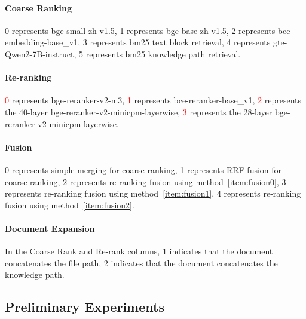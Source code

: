 \documentclass[11pt]{article}
\def\retrievaltextcircled#1{\large{\textcircled{\small{\color{blue}#1}}}\normalsize}
\def\reranktextcircled#1{\large{\textcircled{\small{\textcolor{red}{#1}}}}\normalsize}
\def\fusiontextcircled#1{\large{\textcircled{\small{\color{green}#1}}}\normalsize}
\def\doctextcircled#1{\large{\textcircled{\small{\color{purple}#1}}}\normalsize}
\begin{document}
\paragraph{Coarse Ranking} \retrievaltextcircled{0} represents bge-small-zh-v1.5, \retrievaltextcircled{1} represents bge-base-zh-v1.5, \retrievaltextcircled{2} represents bce-embedding-base\_v1, \retrievaltextcircled{3} represents bm25 text block retrieval, \retrievaltextcircled{4} represents gte-Qwen2-7B-instruct, \retrievaltextcircled{5} represents bm25 knowledge path retrieval.

\paragraph{Re-ranking} \reranktextcircled{0} represents bge-reranker-v2-m3, \reranktextcircled{1} represents bce-reranker-base\_v1, \reranktextcircled{2} represents the 40-layer bge-reranker-v2-minicpm-layerwise, \reranktextcircled{3} represents the 28-layer bge-reranker-v2-minicpm-layerwise.

\paragraph{Fusion} \fusiontextcircled{0} represents simple merging for coarse ranking, \fusiontextcircled{1} represents RRF fusion for coarse ranking, \fusiontextcircled{2} represents re-ranking fusion using method~\ref{item:fusion0}, \fusiontextcircled{3} represents re-ranking fusion using method~\ref{item:fusion1}, \fusiontextcircled{4} represents re-ranking fusion using method~\ref{item:fusion2}.

\paragraph{Document Expansion} In the Coarse Rank and Re-rank columns, \doctextcircled{1} indicates that the document concatenates the file path, \doctextcircled{2} indicates that the document concatenates the knowledge path.

\subsection{Preliminary Experiments}
\end{document}
